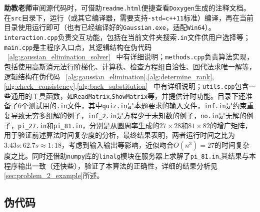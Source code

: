 \noindent \textbf{助教老师}审阅源代码时，可借助\texttt{readme.html}便捷查看\texttt{Doxygen}生成的注释文档。在\texttt{src}目录下，运行（或其它编译器，需要支持\texttt{-std=c++11}标准）编译，再在当前目录使用运行即可（也有已经编译好的\texttt{Gaussian.exe}，适配\texttt{Win64}）。\texttt{interaction.cpp}负责交互功能，包括在当前文件夹搜索\texttt{.in}文件供用户选择等；\texttt{main.cpp}是主程序入口点，其逻辑结构在伪代码 \ \ref{alg:gaussian_elimination_solver} \ 中有详细说明；\texttt{methods.cpp}负责算法实现，包括使用高斯消元法行阶梯化、计算秩、检查方程组自洽性、回代法求唯一解等，逻辑结构在伪代码 \ \ref{alg:gaussian_elimination},\ref{alg:determine_rank},\ref{alg:check_consistency},\ref{alg:back_substitution} \ 中有详细说明；\texttt{utils.cpp}包含一些通用的工具函数，如\texttt{ReadMatrix},\texttt{ShowMatrix}等，并提供计时功能。目录下还准备了$6$个测试用的\texttt{.in}文件，其中\texttt{quiz.in}是本题要求的输入文件，\texttt{inf.in}是约束重复导致无穷多组解的例子，\texttt{inf\_2.in}是方程少于未知数的例子，\texttt{no.in}是无解的例子，\texttt{pi\_27.in}和\texttt{pi\_81.in}，分别是从圆周率生成的$27\times28$和$81\times82$的增广矩阵，用于验证前述算法时间复杂度的分析，最终结果表明，两者运行时间之比为$3.43s:62.7s  \approx 1:18$，考虑到输入输出等影响，近似吻合$O(n^3)=27$的时间复杂度之比。同时还借助\texttt{numpy}库的\texttt{linalg}模块在服务器上求解了\texttt{pi\_81.in},其结果与本程序输出一致（还快些），验证了本算法的正确性，详细的结果分析见\ref{sec:problem_2_example}所述。

\normalem %
\subsection{伪代码}

